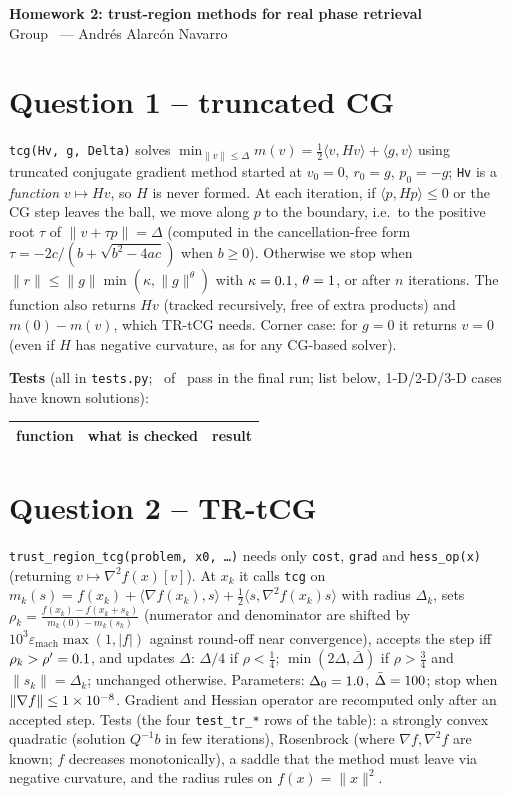 \documentclass[10pt,a4paper]{article}
\newcommand{\groupmembers}{Andrés Alarcón Navarro}
\newcommand{\inner}[2]{\langle #1,#2\rangle}
\newcommand{\code}[1]{\texttt{#1}}
\begin{document}
\begin{center}
{\Large\bfseries Homework 2: trust-region methods for real phase retrieval}\\[2pt]
Group \ParamGroup\ --- \groupmembers
\end{center}

\section*{Question 1 -- truncated CG}
\code{tcg(Hv, g, Delta)} solves $\min_{\|v\|\le\Delta} m(v)=\tfrac12\inner{v}{Hv}+\inner gv$ using truncated conjugate gradient method started at $v_0=0$,
$r_0=g$, $p_0=-g$; \code{Hv} is a \emph{function} $v\mapsto Hv$, so $H$ is never formed. At each iteration, if
$\inner{p}{Hp}\le0$ or the CG step leaves the ball, we move along $p$ to the boundary, i.e.\ to the positive root $\tau$ of
$\|v+\tau p\|=\Delta$ (computed in the cancellation-free form $\tau=-2c/(b+\sqrt{b^2-4ac})$ when $b\ge0$). Otherwise we stop when
$\|r\|\le\|g\|\min(\kappa,\|g\|^{\theta})$ with $\kappa=0.1$, $\theta=1$, or after $n$ iterations. The function also returns
$Hv$ (tracked recursively, free of extra products) and $m(0)-m(v)$, which TR-tCG needs. Corner case: for $g=0$ it returns $v=0$ (even if $H$ has
negative curvature, as for any CG-based solver).

\textbf{Tests} (all in \code{tests.py}; \NumTestsPassed\ of \NumTestsTotal\ pass in the final run; list below, 1-D/2-D/3-D cases have known solutions):
{\scriptsize
\begin{center}
\begin{tabular}{@{}p{5.6cm}p{9.6cm}c@{}}
\toprule function & what is checked & result\\\midrule

\end{tabular}
\end{center}}

\section*{Question 2 -- TR-tCG}
\code{trust\_region\_tcg(problem, x0, \dots)} needs only \code{cost}, \code{grad} and \code{hess\_op(x)} (returning $v\mapsto\nabla^2 f(x)[v]$).
At $x_k$ it calls \code{tcg} on $m_k(s)=f(x_k)+\inner{\nabla f(x_k)}s+\frac12\inner{s}{\nabla^2f(x_k)s}$ with radius $\Delta_k$, sets
$\rho_k=\frac{f(x_k)-f(x_k+s_k)}{m_k(0)-m_k(s_k)}$ (numerator and denominator are shifted by $10^3\varepsilon_{\mathrm{mach}}\max(1,|f|)$ against round-off near convergence),
accepts the step iff $\rho_k>\rho'=0.1$, and updates $\Delta$: $\Delta/4$ if $\rho<\frac14$; $\min(2\Delta,\bar\Delta)$ if $\rho>\frac34$ and
$\|s_k\|=\Delta_k$; unchanged otherwise. Parameters: $\Delta_0=1.0$, $\bar\Delta=100$; stop when $\|\nabla f\|\le1\times10^{-8}$.
Gradient and Hessian operator are recomputed only after an accepted step. Tests (the four \code{test\_tr\_*} rows of the table): a strongly convex quadratic
(solution $Q^{-1}b$ in few iterations), Rosenbrock (where $\nabla f,\nabla^2f$ are known; $f$ decreases monotonically), a saddle that the method must leave
via negative curvature, and the radius rules on $f(x)=\|x\|^2$.
\end{document}

